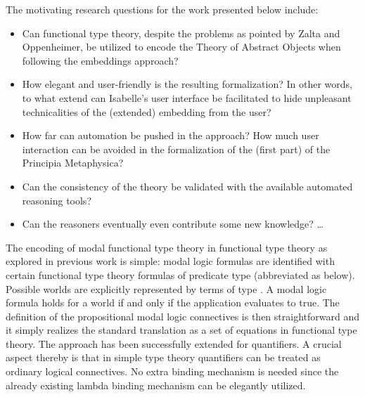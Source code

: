 \begin{isabellebody}
\begin{isamarkuptext}
  The motivating research questions for the work presented below include:
  \begin{itemize} 
  \item Can functional type theory, despite the problems as pointed by Zalta and Oppenheimer, 
   be utilized to encode the Theory of Abstract Objects when following the embeddings approach?
  \item How elegant and user-friendly is the resulting formalization? In other
   words, to what extend can Isabelle's  user interface be facilitated to hide 
   unpleasant technicalities of the (extended) embedding from the user?
  \item How far can automation be pushed in the approach? How much user interaction can
   be avoided in the formalization of the (first part) of the Principia Metaphysica? 
  \item Can the consistency of the theory be validated with the available automated 
   reasoning tools?
  \item Can the reasoners eventually even contribute some new knowledge? 
  \ldots
  \end{itemize}%
\end{isamarkuptext}%
\isamarkuptrue%
%
\begin{isamarkuptext}%
The encoding of modal functional type theory in functional type theory as explored in 
  previous work \cite{J23,C40} is simple: modal logic formulas are identified with certain functional 
  type theory formulas of predicate type  (abbreviated as  below). 
  Possible worlds are explicitly represented by 
  terms of type  . A modal logic \isa{{\isasymphi}} formula holds for a world  if and 
  only if the application  evaluates to true. The definition of the propositional modal logic 
  connectives is then straightforward and it simply realizes the standard translation as a set of equations 
  in functional type theory. The approach has been successfully extended for quantifiers. A crucial 
  aspect thereby is that in simple type theory quantifiers can be treated
  as ordinary logical connectives. No extra binding mechanism is needed since the already existing 
  lambda binding mechanism can be elegantly utilized. 
  

\end{isamarkuptext}
\end{isabellebody}
